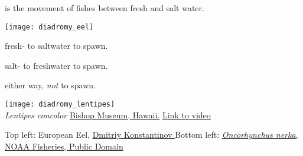 \documentclass[t]{beamer}
\begin{document}
%

\begin{frame}[t]{ is the movement of fishes between fresh and salt water.}

\vspace{-\baselineskip}

\begin{multicols}{2}

\texttt{[image: diadromy\_eel]}


\columnbreak

 fresh- to saltwater to spawn.

 salt- to freshwater to spawn.

 either way, \emph{not} to spawn.

\vspace{\baselineskip}

\texttt{[image: diadromy\_lentipes]}\\
\tiny \textit{Lentipes concolor} \href{http://hbs.bishopmuseum.org/waipio/Critter\%20pages/lentipes.html}{Bishop Museum, Hawaii.}  \href{https://www.youtube.com/watch?v=mmwM7dwtvKA}{Link to video} 

\end{multicols}


\vfilll

\tiny Top left: European Eel, \href{https://commons.wikimedia.org/wiki/File:Anguilla-anguilla_1.jpg}{Dmitriy Konstantinov } \hfill Bottom left:  \href{https://www.fisheries.noaa.gov/species/sockeye-salmon}{\textit{Oncorhynchus nerka}, NOAA Fisheries, Public Domain}

\end{frame}

%
\end{document}
